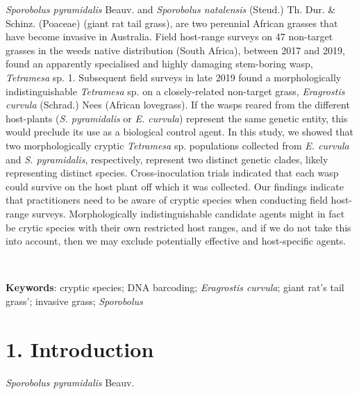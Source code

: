 \documentclass[12pt,]{article}
\begin{document}
\emph{Sporobolus pyramidalis} Beauv. and \emph{Sporobolus natalensis}
(Steud.) Th. Dur. \& Schinz. (Poaceae) (giant rat tail grass), are two
perennial African grasses that have become invasive in Australia. Field
host-range surveys on 47 non-target grasses in the weeds native
distribution (South Africa), between 2017 and 2019, found an apparently
specialised and highly damaging stem-boring wasp, \emph{Tetramesa} sp.
1. Subsequent field surveys in late 2019 found a morphologically
indistinguishable \emph{Tetramesa} sp. on a closely-related non-target
grass, \emph{Eragrostis curvula} (Schrad.) Nees (African lovegrass). If
the wasps reared from the different host-plants (\emph{S. pyramidalis}
or \emph{E. curvula}) represent the same genetic entity, this would
preclude its use as a biological control agent. In this study, we showed
that two morphologically cryptic \emph{Tetramesa} sp. populations
collected from \emph{E. curvula} and \emph{S. pyramidalis},
respectively, represent two distinct genetic clades, likely representing
distinct species. Cross-inoculation trials indicated that each wasp
could survive on the host plant off which it was collected. Our findings
indicate that practitioners need to be aware of cryptic species when
conducting field host-range surveys. Morphologically indistinguishable
candidate agents might in fact be crytic species with their own
restricted host ranges, and if we do not take this into account, then we
may exclude potentially effective and host-specific agents.

~

\setlength{\parindent}{0in}
\setlength{\leftskip}{0in}
\setlength{\parskip}{8pt}
\vspace*{-0.2in}

\noindent

\textbf{Keywords}: cryptic species; DNA barcoding; \emph{Eragrostis
curvula}; giant rat's tail grass'; invasive grass; \emph{Sporobolus}

\pagebreak
\setlength\parindent{24pt}

\hypertarget{introduction}{%
\section{1. Introduction}\label{introduction}}

\emph{Sporobolus pyramidalis} Beauv.
\end{document}

